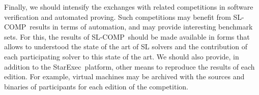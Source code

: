 \documentclass[orivec]{llncs}
\newcommand{\slcomp}{\textsf{SL-COMP}}
\newcommand{\starexec}{\textsf{StarExec}}
\begin{document}
Finally, we should intensify the exchanges with related competitions in software verification and automated proving. Such competitions may benefit from \slcomp\ results in terms of automation, and may provide interesting benchmark sets.
For this, the results of \slcomp\ should be made available in forms that allows to understood  the state of the art of SL solvers and the contribution of each participating solver to this state of the art.
We should also provide, in addition to the \starexec\ platform, other means to reproduce the results of each edition. For example, virtual machines may be archived with the sources and binaries of participants for each edition of the competition.


%




\end{document}
